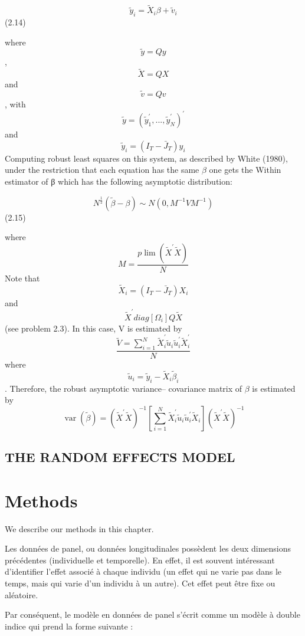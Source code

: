 \documentclass[
]{book}
\begin{document}
\[  \widetilde {y}_i=\widetilde{X}_{i} \beta + \widetilde{v}_{i}  \]
(2.14)

where \[\widetilde{y}=Qy \] , \[\widetilde{X}=QX \] and \[\widetilde{v}=Qv \] ,
with \[\widetilde{y}=(\widetilde{y}_1^{\prime}, ...,\widetilde{y}_N^{\prime} )^{\prime} \] and \[\widetilde{y}_i=(I_T-\bar{J}_T) y_i \] Computing
robust least squares on this system, as described by White (1980), under the restriction
that each equation has the same \(\beta\) one gets the Within estimator of β which has the following
asymptotic distribution:

\[N^{\frac{1}{2} }  (\widetilde{\beta}- \beta ) \sim N(0,M^{-1}VM^{-1} ) \]
(2.15)

where
\[M=\frac{ p\lim(\widetilde{X}^{\prime} \widetilde{X})} {N} \]
Note that \[\widetilde{X}_i=(I_T - \bar{J}_T) X_i  \] and \[\widetilde{X}^{\prime} diag[\Omega_i] Q \widetilde{X} \] (see problem 2.3). In this case, V is estimated by
\[ \frac{  \widetilde{V}=\sum_{i=1}^{N} \widetilde{X}_i^{\prime}\widetilde{u}_i \widetilde{u}_i^{\prime}\widetilde{X}_i^{\prime} } {N}  \]
where \[\widetilde{u}_i=\widetilde{y}_i- \widetilde{X}_i \widetilde{\beta}_i\] .
Therefore, the robust asymptotic variance--
covariance matrix of \(\beta\) is estimated by
\[
\operatorname{var}(\widetilde{\beta})=\left(\widetilde{X}^{\prime} \tilde{X}\right)^{-1}\left[\sum_{i=1}^{N} \widetilde{X}_{i}^{\prime} \tilde{u}_{i} \tilde{u}_{i}^{\prime} \widetilde{X}_{i}\right]\left(\widetilde{X}^{\prime} \tilde{X}\right)^{-1}
\]

\hypertarget{the-random-effects-model}{%
\section{THE RANDOM EFFECTS MODEL}\label{the-random-effects-model}}

\hypertarget{methods}{%
\chapter{Methods}\label{methods}}

We describe our methods in this chapter.

Les données de panel, ou données longitudinales possèdent les deux dimensions précédentes (individuelle et temporelle). En effet, il est souvent intéressant d'identifier l'effet associé à chaque individu (un effet qui ne varie pas dans le temps, mais qui varie d'un individu à un autre). Cet effet peut être fixe ou aléatoire.

Par conséquent, le modèle en données de panel s'écrit comme un modèle à double indice qui prend la forme suivante :
\end{document}
